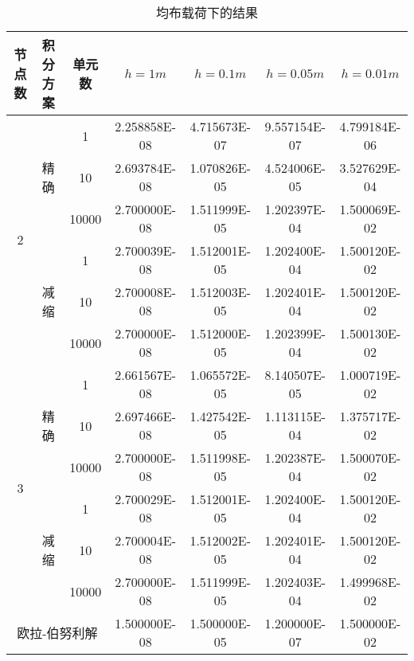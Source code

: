 \documentclass[UTF8,c5size]{ctexart}
\begin{document}
\begin{table}[htbp]
    \begin{center}
        \caption{均布载荷下的结果}
        \label{表1}
        \begin{tabular}{|c|c|c|c|c|c|c|}
            \hline
            节点数&积分方案&单元数&$h=1m$&$h=0.1m$&$h=0.05m$&$h=0.01m$\\
            \hline
            \multirow{6}{*}{2}&\multirow{3}{*}{精确}&
            1&2.258858E-08&4.715673E-07&9.557154E-07&4.799184E-06\\
            \cline{3-7}
            &&
            10&2.693784E-08&1.070826E-05&4.524006E-05&3.527629E-04\\
            \cline{3-7}
            &&
            10000&2.700000E-08&1.511999E-05&1.202397E-04&1.500069E-02\\
            \cline{2-7}
            &\multirow{3}{*}{减缩}&
            1&2.700039E-08&1.512001E-05&1.202400E-04&1.500120E-02\\
            \cline{3-7}
            &&
            10&2.700008E-08&1.512003E-05&1.202401E-04&1.500120E-02\\
            \cline{3-7}
            &&
            10000&2.700000E-08&1.512000E-05&1.202399E-04&1.500130E-02\\
            \hline
    
            \multirow{6}{*}{3}&\multirow{3}{*}{精确}&
            1&2.661567E-08&1.065572E-05&8.140507E-05&1.000719E-02\\
            \cline{3-7}
            &&
            10&2.697466E-08&1.427542E-05&1.113115E-04&1.375717E-02\\
            \cline{3-7}
            &&
            10000&2.700000E-08&1.511998E-05&1.202387E-04&1.500070E-02\\
            \cline{2-7}
            &\multirow{3}{*}{减缩}&
            1&2.700029E-08&1.512001E-05&1.202400E-04&1.500120E-02\\
            \cline{3-7}
            &&
            10&2.700004E-08&1.512002E-05&1.202401E-04&1.500120E-02\\
            \cline{3-7}
            &&
            10000&2.700000E-08&1.511999E-05&1.202403E-04&1.499968E-02\\
            \hline
    
            \multicolumn{3}{|c|}{欧拉-伯努利解}
            &1.500000E-08&1.500000E-05&1.200000E-07&1.500000E-02\\
            \hline
    
        \end{tabular}
    \end{center}
\end{table}
\end{document}
